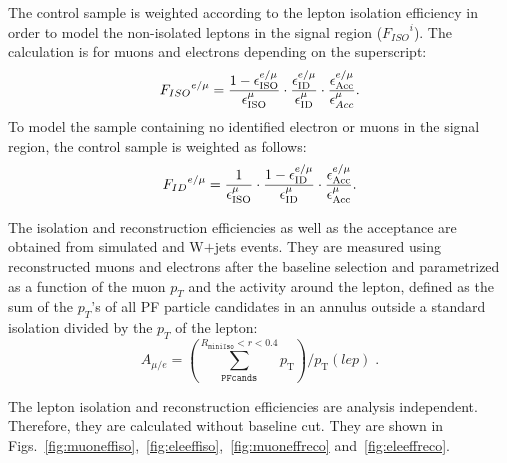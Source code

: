 The control sample is weighted according to the lepton isolation efficiency in order to model the non-isolated leptons in the signal region (${F_{ISO}}^{i}$). 
The calculation is for muons and electrons depending on the superscript:
\begin{equation}
{F_{ISO}}^{e/\mu} =  \frac{1-\epsilon_{\rm ISO}^{e/\mu}}{\epsilon_{\rm ISO}^{\mu}} \cdot \frac{\epsilon^{e/\mu}_{\rm ID}}{\epsilon^{\mu}_{\rm ID}} \cdot \frac{\epsilon^{e/\mu}_{\rm Acc}}{\epsilon^{\mu}_{Acc}}.
\label{eq:isolation}
\end{equation}
To model the sample containing no identified electron or muons in the signal region, the control sample is weighted as follows:
\begin{equation}
{F_{ID}}^{e/\mu} = \frac{1}{\epsilon_{\rm ISO}^{\mu}}\cdot \frac{1-\epsilon_{\rm ID}^{e/\mu}}{\epsilon_{\rm ID}^{\mu}}  \cdot \frac{\epsilon^{e/\mu}_{\rm Acc}}{\epsilon^{\mu}_{\rm Acc}}.
\label{eq:id}
\end{equation}

The isolation and reconstruction efficiencies as well as the acceptance are obtained from simulated \ttbar and W$+$jets events. They are measured using reconstructed muons and electrons after the baseline selection and parametrized as a function of the muon $p_T$ and the activity around the lepton, defined as the sum of the $p_{T}$'s of all PF particle candidates in an annulus outside a standard isolation divided by the $p_T$ of the lepton:
\begin{equation}
\textit{$A_{\mu/e}$}=\left(\sum^{R_\texttt{miniIso}<r<0.4}_\texttt{PFcands} p_\text{T}\right) / p_\text{T}(lep) \; .
\label{eq:activity}
\end{equation}

The lepton isolation and reconstruction efficiencies are analysis independent. Therefore, they are calculated without baseline cut. They are shown in Figs.~\ref{fig:muoneffiso},~\ref{fig:eleeffiso},~\ref{fig:muoneffreco} and~\ref{fig:eleeffreco}.

